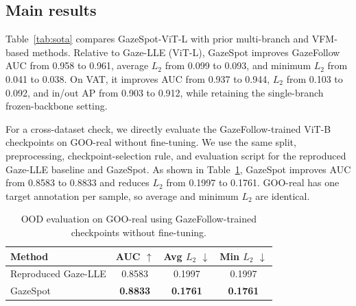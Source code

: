 \documentclass{article}
\begin{document}
\subsection{Main results}
Table~\ref{tab:sota} compares GazeSpot-ViT-L with prior multi-branch and VFM-based methods. Relative to Gaze-LLE (ViT-L), GazeSpot improves GazeFollow AUC from 0.958 to 0.961, average $L_2$ from 0.099 to 0.093, and minimum $L_2$ from 0.041 to 0.038. On VAT, it improves AUC from 0.937 to 0.944, $L_2$ from 0.103 to 0.092, and in/out AP from 0.903 to 0.912, while retaining the single-branch frozen-backbone setting.

For a cross-dataset check, we directly evaluate the GazeFollow-trained ViT-B checkpoints on GOO-real without fine-tuning. We use the same split, preprocessing, checkpoint-selection rule, and evaluation script for the reproduced Gaze-LLE baseline and GazeSpot. As shown in Table~\ref{tab:goo}, GazeSpot improves AUC from 0.8583 to 0.8833 and reduces $L_2$ from 0.1997 to 0.1761. GOO-real has one target annotation per sample, so average and minimum $L_2$ are identical.

\begin{table}[t]
  \centering
  \caption{OOD evaluation on GOO-real using GazeFollow-trained checkpoints without fine-tuning.}
  \label{tab:goo}
  \renewcommand{\arraystretch}{1.05}
  \begin{tabular*}{\columnwidth}{@{\extracolsep{\fill}}lccc@{}}
    \toprule
    Method & AUC $\uparrow$ & Avg $L_2$ $\downarrow$ & Min $L_2$ $\downarrow$\\
    \midrule
    Reproduced Gaze-LLE & 0.8583 & 0.1997 & 0.1997\\
    GazeSpot & \textbf{0.8833} & \textbf{0.1761} & \textbf{0.1761}\\
    \bottomrule
  \end{tabular*}
\end{table}
\end{document}
